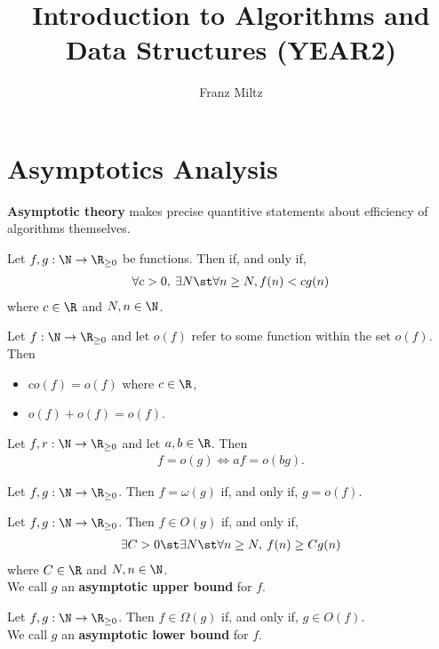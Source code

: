 \documentclass{article}
\begin{document}
\title{Introduction to Algorithms and Data Structures (YEAR2)}
\author{Franz Miltz}
\maketitle
\tableofcontents
\pagebreak


\section{Asymptotics Analysis}



\textbf{Asymptotic theory} makes precise quantitive statements about efficiency of algorithms themselves.
\begin{definition}
	Let $f,g:\N\to\R_{\geq 0}$ be functions. Then
	 if, and only if, 
	\begin{align*}
		\forall c>0,\:\exists N\st \forall n \geq N, f(n)<cg(n)
	\end{align*}
	where $c\in\R$ and $N,n\in\N$.
\end{definition}
\begin{theorem}
	Let $f:\N\to\R_{\geq 0}$ and let $o(f)$ refer to some
	function within the set $o(f)$. Then
	\begin{itemize}
		\item $co(f)=o(f)$ where $c\in\R$,
		\item $o(f) + o(f) = o(f)$.
	\end{itemize}
\end{theorem}
\begin{theorem}
	Let $f,r:\N\to\R_{\geq 0}$ and let $a,b\in\R$. Then
	\begin{align*}
		f=o(g) \Leftrightarrow af=o(bg).	
	\end{align*}
\end{theorem}
\begin{definition}
	Let $f,g:\N\to\R_{\geq 0}$. Then $f=\omega(g)$ if, and only if, $g=o(f)$.
\end{definition}
\begin{definition}
	Let $f,g:\N\to\R_{\geq 0}$. Then $f\in O(g)$ if, and only if,
	\begin{align*}
		\exists C > 0\st \exists N \st \forall n \geq N,\: f(n) \geq Cg(n)
	\end{align*}
	where $C\in\R$ and $N,n\in\N$.\\
	We call $g$ an \textbf{asymptotic upper bound} for $f$.
\end{definition}
\begin{definition}
	Let $f,g:\N\to\R_{\geq 0}$. Then $f\in\Omega(g)$ if, and only if, $g\in O(f)$.\\
	We call $g$ an \textbf{asymptotic lower bound} for $f$.
\end{definition}
\end{document}
